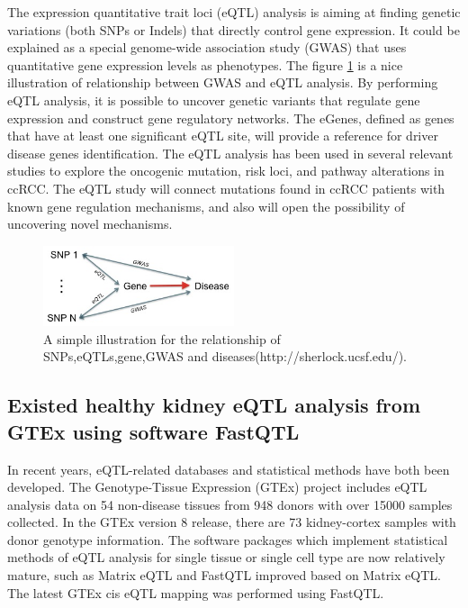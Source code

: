 The expression quantitative trait loci (eQTL) analysis is aiming at finding genetic variations (both SNPs or Indels) that directly control gene expression. It could be explained as a special genome-wide association study (GWAS) that uses quantitative gene expression levels as phenotypes. The figure \ref{Causal} is a nice illustration of relationship between GWAS and eQTL analysis. By performing eQTL analysis, it is possible to uncover genetic variants that regulate gene expression and construct gene regulatory networks. The eGenes, defined as genes that have at least one significant eQTL site, will provide a reference for driver disease genes identification. The eQTL analysis has been used in several relevant studies to explore the oncogenic mutation, risk loci, and pathway alterations in ccRCC. The eQTL study will connect mutations found in ccRCC patients with known gene regulation mechanisms, and also will open the possibility of uncovering novel mechanisms.

\begin{figure}[h]
\centering
\includegraphics[width=0.5\textwidth]{figures/Causal.jpg}
\caption{A simple illustration for the relationship of SNPs,eQTLs,gene,GWAS and diseases(http://sherlock.ucsf.edu/).}
\label{Causal}
\end{figure}

\subsection{Existed healthy kidney eQTL analysis from GTEx using software FastQTL}

In recent years, eQTL-related databases and statistical methods have both been developed. The Genotype-Tissue Expression (GTEx) project includes eQTL analysis data on 54 non-disease tissues from 948 donors with over 15000 samples collected. In the GTEx version 8 release, there are 73 kidney-cortex samples with donor genotype information. The software packages which implement statistical methods of eQTL analysis for single tissue or single cell type are now relatively mature, such as Matrix eQTL\cite{shabalin_matrix_2012} and FastQTL\cite{ongen_fast_2016} improved based on Matrix eQTL. The latest GTEx cis eQTL mapping was performed using FastQTL.

